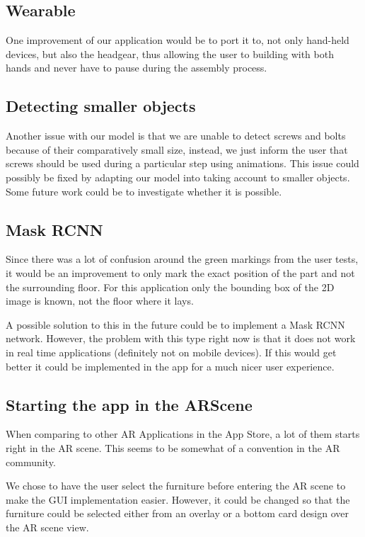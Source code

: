 \subsection{Wearable}
One improvement of our application would be to port it to, not only hand-held devices, but also the headgear, thus allowing the user to building with both hands and never have to pause during the assembly process.

\subsection{Detecting smaller objects}
Another issue with our model is that we are unable to detect screws and bolts because of their 
comparatively small size, instead, we just inform the user that screws should be used during a particular step using animations.
This issue could possibly be fixed by adapting our model into taking account to smaller objects.
Some future work could be to investigate whether it is possible.

\subsection{Mask RCNN}
Since there was a lot of confusion around the green markings from the user tests, it would be an
improvement to only mark the exact position of the part and not the surrounding floor.
For this application only the bounding box of the 2D image is known, not the floor where it lays.

A possible solution to this in the future could be to implement a Mask RCNN network. However, 
the problem with this type right now is that it does not work in real time applications (definitely not on mobile devices).
If this would get better it could be implemented in the app for a much nicer user experience.

\subsection{Starting the app in the ARScene}
When comparing to other AR Applications in the App Store, a lot of them starts right in the AR 
scene. This seems to be somewhat of a convention in the AR community.

We chose to have the user select the furniture before entering the AR scene to make the GUI
implementation easier. However, it could be changed so that the furniture could be selected
either from an overlay or a bottom card design over the AR scene view.


